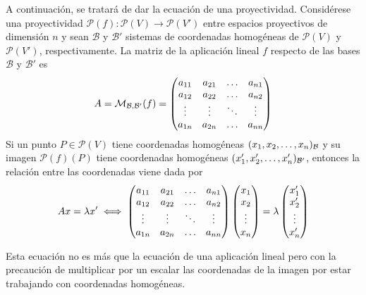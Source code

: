 \documentclass[12pt]{report}
\theoremstyle{definition}
\theoremstyle{definition}
\theoremstyle{remark}
\begin{document}
A continuación, se tratará de dar la ecuación de una proyectividad. Considérese una proyectividad $\mathcal{P}(f) \colon \mathcal{P}(V) \to \mathcal{P}(V')$ entre espacios proyectivos de dimensión $n$ y sean $\mathcal{B}$ y $\mathcal{B'}$ sistemas de coordenadas homogéneas de $\mathcal{P}(V)$ y $\mathcal{P}(V')$, respectivamente. La matriz de la aplicación lineal $f$ respecto de las bases $\mathcal{B}$ y $\mathcal{B'}$ es
\[A = \mathcal{M}_{\mathcal{B},\mathcal{B'}}(f) = \begin{pmatrix*}
    a_{11} & a_{21} & \mathellipsis & a_{n1} \\
    a_{12} & a_{22} & \mathellipsis & a_{n2} \\
    \vdots & \vdots & \ddots & \vdots \\
    a_{1n} & a_{2n} & \mathellipsis & a_{nn}
\end{pmatrix*}\]
Si un punto $P \in \mathcal{P}(V)$ tiene coordenadas homogéneas $(x_1,x_2,\mathellipsis,x_n)_{\mathcal{B}}$ y su imagen $\mathcal{P}(f)(P)$ tiene coordenadas homogéneas $(x'_1,x'_2,\mathellipsis,x'_n)_{\mathcal{B'}}$, entonces la relación entre las coordenadas viene dada por
\[Ax = \lambda x' \iff \begin{pmatrix*}
    a_{11} & a_{21} & \mathellipsis & a_{n1} \\
    a_{12} & a_{22} & \mathellipsis & a_{n2} \\
    \vdots & \vdots & \ddots & \vdots \\
    a_{1n} & a_{2n} & \mathellipsis & a_{nn}
\end{pmatrix*} \begin{pmatrix*}
    x_1 \\
    x_2 \\
    \vdots \\
    x_n
\end{pmatrix*} = \lambda \begin{pmatrix*}
    x'_1 \\
    x'_2 \\
    \vdots \\
    x'_n
\end{pmatrix*}\]

Esta ecuación no es más que la ecuación de una aplicación lineal pero con la precaución de multiplicar por un escalar las coordenadas de la imagen por estar trabajando con coordenadas homogéneas.
\end{document}
